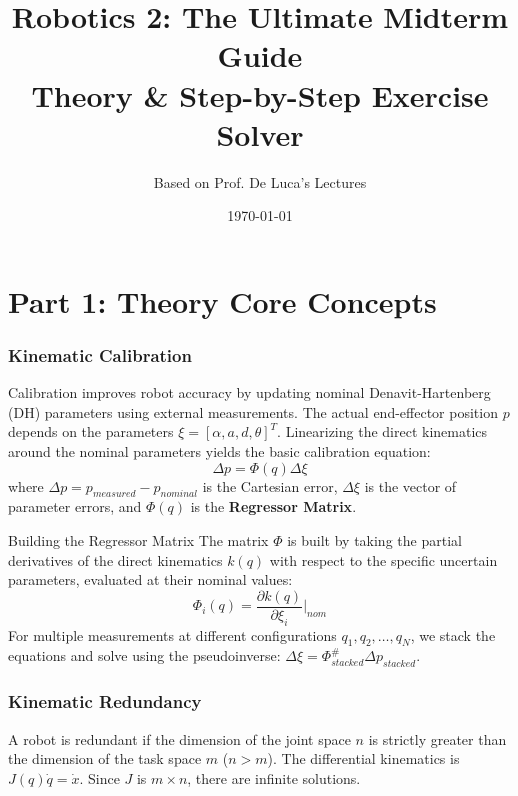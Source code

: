 \documentclass[11pt,a4paper]{article}
\title{\textbf{\Huge Robotics 2: The Ultimate Midterm Guide} \\ \Large Theory \& Step-by-Step Exercise Solver}
\author{Based on Prof. De Luca's Lectures}
\date{\today}
\begin{document}
\maketitle
\tableofcontents
\newpage

\part*{Part 1: Theory Core Concepts}

\section{Kinematic Calibration}
Calibration improves robot accuracy by updating nominal Denavit-Hartenberg (DH) parameters using external measurements. The actual end-effector position $p$ depends on the parameters $\xi = [\alpha, a, d, \theta]^T$.
Linearizing the direct kinematics around the nominal parameters yields the basic calibration equation:
\begin{equation}
    \Delta p = \Phi(q) \Delta \xi
\end{equation}
where $\Delta p = p_{measured} - p_{nominal}$ is the Cartesian error, $\Delta \xi$ is the vector of parameter errors, and $\Phi(q)$ is the \textbf{Regressor Matrix}. 

\begin{theorybox}{Building the Regressor Matrix}
The matrix $\Phi$ is built by taking the partial derivatives of the direct kinematics $k(q)$ with respect to the specific uncertain parameters, evaluated at their nominal values:
\begin{equation}
    \Phi_i(q) = \frac{\partial k(q)}{\partial \xi_i}\Bigg|_{nom}
\end{equation}
For multiple measurements at different configurations $q_1, q_2, \dots, q_N$, we stack the equations and solve using the pseudoinverse: $\Delta \xi = \Phi_{stacked}^{\#} \Delta p_{stacked}$.
\end{theorybox}


\section{Kinematic Redundancy}
A robot is redundant if the dimension of the joint space $n$ is strictly greater than the dimension of the task space $m$ ($n > m$).
The differential kinematics is $J(q)\dot{q} = \dot{x}$. Since $J$ is $m \times n$, there are infinite solutions. 
\end{document}
